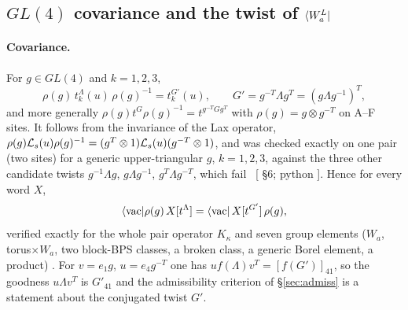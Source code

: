 \subsection{$GL(4)$ covariance and the twist of $\langle W_a^L|$}\label{sec:conv-cov}

\paragraph{Covariance.} For $g\in GL(4)$ and $k=1,2,3$,
\begin{equation}
 \rho(g)\,t^\Lambda_k(u)\,\rho(g)^{-1}=t^{G'}_k(u),\qquad G'=g^{-T}\Lambda g^{T}=(g\Lambda g^{-1})^T,
\end{equation}
and more generally $\rho(g)t^G\rho(g)^{-1}=t^{g^{-T}Gg^T}$ with $\rho(g)=g\otimes g^{-T}$ on A--F sites. It follows from the
invariance of the Lax operator, $\rho(g)\mathcal L_s(u)\rho(g)^{-1}=(g^T\otimes1)\mathcal L_s(u)(g^{-T}\otimes1)$, and was checked exactly
on one pair (two sites) for a generic upper-triangular $g$, $k=1,2,3$, against the three other candidate twists $g^{-1}\Lambda g$,
$g\Lambda g^{-1}$, $g^T\Lambda g^{-T}$, which fail \ex\ [ \S6; python
]. Hence for every word $X$,
\begin{equation}
 \langle\mathrm{vac}|\rho(g)\,X[t^\Lambda]=\langle\mathrm{vac}|\,X[t^{G'}]\,\rho(g),
\end{equation}
verified exactly for the whole pair operator $K_\kappa$ and seven group elements ($W_a$, torus$\times W_a$, two block-BPS
classes, a broken class, a generic Borel element, a product) \ex. For $v=e_1g$, $u=e_4g^{-T}$ one has
$uf(\Lambda)v^T=[f(G')]_{41}$, so the goodness $u\Lambda v^T$ is $G'_{41}$ and the admissibility criterion of
\S\ref{sec:admiss} is a statement about the conjugated twist $G'$.


